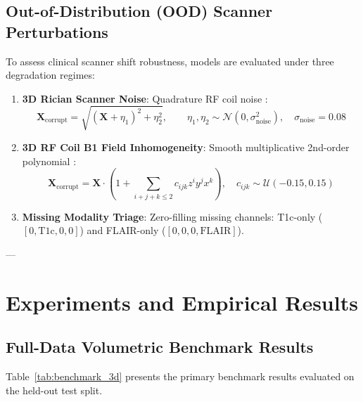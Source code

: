 \documentclass{article}
\begin{document}
\subsection{Out-of-Distribution (OOD) Scanner Perturbations}
To assess clinical scanner shift robustness, models are evaluated under three degradation regimes:
\begin{enumerate}
    \item \textbf{3D Rician Scanner Noise}: Quadrature RF coil noise \citep{gudbjartsson1995rician}:
    \begin{equation}
        \mathbf{X}_{\text{corrupt}} = \sqrt{(\mathbf{X} + \eta_1)^2 + \eta_2^2}, \qquad \eta_1, \eta_2 \sim \mathcal{N}(0, \sigma_{\text{noise}}^2), \quad \sigma_{\text{noise}} = 0.08
    \end{equation}
    \item \textbf{3D RF Coil B1 Field Inhomogeneity}: Smooth multiplicative 2nd-order polynomial \citep{sled1998nonparametric}:
    \begin{equation}
        \mathbf{X}_{\text{corrupt}} = \mathbf{X} \cdot \left( 1 + \sum_{i+j+k \le 2} c_{ijk} z^i y^j x^k \right), \quad c_{ijk} \sim \mathcal{U}(-0.15, 0.15)
    \end{equation}
    \item \textbf{Missing Modality Triage}: Zero-filling missing channels: T1c-only ($[0, \text{T1c}, 0, 0]$) and FLAIR-only ($[0, 0, 0, \text{FLAIR}]$).
\end{enumerate}

---

\section{Experiments and Empirical Results}

\subsection{Full-Data Volumetric Benchmark Results}

Table~\ref{tab:benchmark_3d} presents the primary benchmark results evaluated on the held-out test split.
\end{document}
